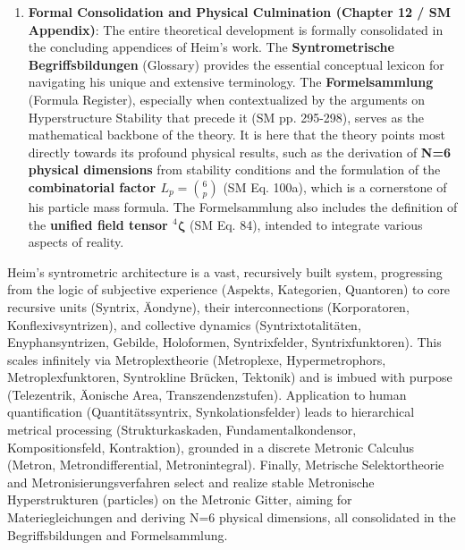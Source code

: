 \documentclass[
    12pt,              %
    a4paper,           %
    headings=normal,   %
    twoside=true,      %
    BCOR=8mm,          %
]{scrbook}
\newcommand{\strukturkompressor}{{}^4\bm{\zeta}}
\begin{document}
\begin{enumerate}
    \item \textbf{Formal Consolidation and Physical Culmination (Chapter 12 / SM Appendix)}: The entire theoretical development is formally consolidated in the concluding appendices of Heim's work. The \textbf{Syntrometrische Begriffsbildungen} (Glossary) provides the essential conceptual lexicon for navigating his unique and extensive terminology. The \textbf{Formelsammlung} (Formula Register), especially when contextualized by the arguments on Hyperstructure Stability that precede it (SM pp. 295-298), serves as the mathematical backbone of the theory. It is here that the theory points most directly towards its profound physical results, such as the derivation of \textbf{N=6 physical dimensions} from stability conditions and the formulation of the \textbf{combinatorial factor \( L_p = \binom{6}{p} \)} (SM Eq. 100a), which is a cornerstone of his particle mass formula. The Formelsammlung also includes the definition of the \textbf{unified field tensor \( \strukturkompressor \)} (SM Eq. 84), intended to integrate various aspects of reality.
\end{enumerate}
Heim's syntrometric architecture is a vast, recursively built system, progressing from the logic of subjective experience (Aspekts, Kategorien, Quantoren) to core recursive units (Syntrix, Äondyne), their interconnections (Korporatoren, Konflexivsyntrizen), and collective dynamics (Syntrixtotalitäten, Enyphansyntrizen, Gebilde, Holoformen, Syntrixfelder, Syntrixfunktoren). This scales infinitely via Metroplextheorie (Metroplexe, Hypermetrophors, Metroplexfunktoren, Syntrokline Brücken, Tektonik) and is imbued with purpose (Telezentrik, Äonische Area, Transzendenzstufen). Application to human quantification (Quantitätssyntrix, Synkolationsfelder) leads to hierarchical metrical processing (Strukturkaskaden, Fundamentalkondensor, Kompositionsfeld, Kontraktion), grounded in a discrete Metronic Calculus (Metron, Metrondifferential, Metronintegral). Finally, Metrische Selektortheorie and Metronisierungsverfahren select and realize stable Metronische Hyperstrukturen (particles) on the Metronic Gitter, aiming for Materiegleichungen and deriving N=6 physical dimensions, all consolidated in the Begriffsbildungen and Formelsammlung.
\end{document}
